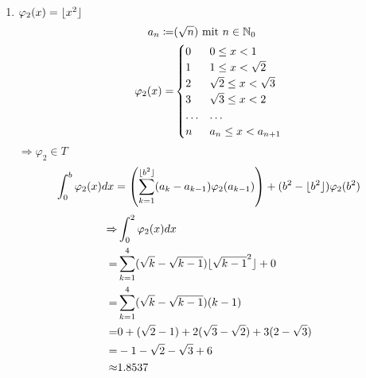 \documentclass{HM}
\begin{document}
\begin{enumerate}
\begin{enumerate}
		 	\newpage
		 	\item $\varphi_2(x)=\lfloor x^2\rfloor$
		 	\begin{align*}
		 	a_n\coloneqq&(\sqrt{n}) \text{ mit } n\in\mathbb{N}_0\\ 
		 	\varphi_2(x)=&\begin{cases}
		 	0&0\leq x<1\\
		 	1&1\leq x<\sqrt{2}\\
		 	2&\sqrt{2}\leq x<\sqrt{3}\\
		 	3&\sqrt{3}\leq x<2\\
		 	\hdots&\hdots\\
		 	n&a_n\leq x<a_{n+1}
		 	\end{cases}
		 	\end{align*}
		 	$\Rightarrow \varphi_2\in T$
		 	$$\int_0^b\varphi_2(x)dx=\left(\sum\limits_{k=1}^{\lfloor b^2\rfloor}(a_{k}-a_{k-1})\varphi_2(a_{k-1})\right)+(b^2-\lfloor b^2\rfloor)\varphi_2(b^2)$$
		 	\begin{align*}
		 	\Rightarrow &\int_0^2\varphi_2(x)dx\\
		 	=&\sum\limits_{k=1}^{4}(\sqrt{k}-\sqrt{k-1})\lfloor\sqrt{k-1}^2\rfloor+0\\
		 	=&\sum\limits_{k=1}^{4}(\sqrt{k}-\sqrt{k-1})(k-1)\\
		 	=&0+(\sqrt{2}-1)+2(\sqrt{3}-\sqrt{2})+3(2-\sqrt{3})\\
		 	=&-1-\sqrt{2}-\sqrt{3}+6\\
		 	\approx&1.8537
		 	\end{align*}
		 \end{enumerate}
		 

\end{enumerate}
\end{document}
